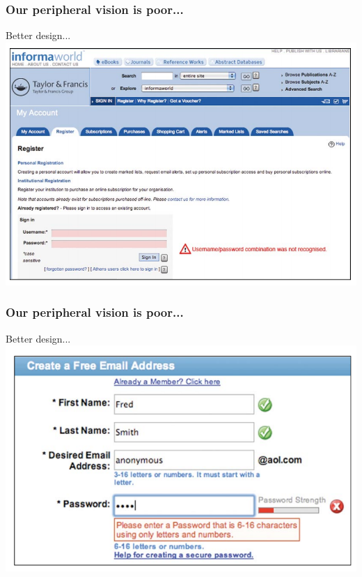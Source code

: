 \documentclass{beamer}
\begin{document}
\begin{frame}
\frametitle{Our peripheral vision is poor...}
Better design...
\vfill
\centering
\includegraphics[width=0.8\linewidth]{image/peripheral7}
\end{frame}

\begin{frame}
\frametitle{Our peripheral vision is poor...}
Better design...
\vfill
\centering
\includegraphics[width=0.8\linewidth]{image/peripheral8}
\end{frame}

\end{document}
